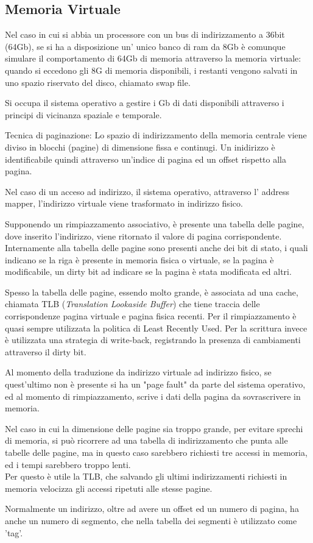 \documentclass[../template]{subfiles}
\begin{document}
\subsection{Memoria Virtuale}
Nel caso in cui si abbia un processore con un bus di indirizzamento a 36bit (64Gb), se si ha a disposizione un' unico banco di ram da 8Gb è comunque simulare il comportamento di 64Gb di memoria attraverso la memoria virtuale: quando si eccedono gli 8G di memoria disponibili, i restanti vengono salvati in uno spazio riservato del disco, chiamato swap file.

Si occupa il sistema operativo a gestire i Gb di dati disponibili attraverso i principi di vicinanza spaziale e temporale.

Tecnica di paginazione:
Lo spazio di indirizzamento della memoria centrale viene diviso in blocchi (pagine) di dimensione fissa e continugi. Un inidirizzo è identificabile quindi attraverso un'indice di pagina ed un offset rispetto alla pagina.

Nel caso di un acceso ad indirizzo, il sistema operativo, attraverso l' address mapper, l'indirizzo virtuale viene trasformato in indirizzo fisico.

Supponendo un rimpiazzamento associativo, è presente una tabella delle pagine, dove inserito l'indirizzo, viene ritornato il valore di pagina corrispondente. Internamente alla tabella delle pagine sono presenti anche dei bit di stato, i quali indicano se la riga è presente in memoria fisica o virtuale, se la pagina è modificabile, un dirty bit ad indicare se la pagina è stata modificata ed altri.

Spesso la tabella delle pagine, essendo molto grande, è associata ad una cache, chiamata TLB (\textit{Translation Lookaside Buffer}) che tiene traccia delle corrispondenze pagina virtuale e pagina fisica recenti.
Per il rimpiazzamento è quasi sempre utilizzata la politica di Least Recently Used. Per la scrittura invece è utilizzata una strategia di write-back, registrando la presenza di cambiamenti attraverso il dirty bit.

Al momento della traduzione da indirizzo virtuale ad indirizzo fisico, se quest'ultimo non è presente si ha un "page fault" da parte del sistema operativo, ed al momento di rimpiazzamento, scrive i dati della pagina da sovrascrivere in memoria.

Nel caso in cui la dimensione delle pagine sia troppo grande, per evitare sprechi di memoria, si può ricorrere ad una tabella di indirizzamento che punta alle tabelle delle pagine, ma in questo caso sarebbero richiesti tre accessi in memoria, ed i tempi sarebbero troppo lenti.
\\
Per questo è utile la TLB, che salvando gli ultimi indirizzamenti richiesti in memoria velocizza gli accessi ripetuti alle stesse pagine.

Normalmente un indirizzo, oltre ad avere un offset ed un numero di pagina, ha anche un numero di segmento, che nella tabella dei segmenti è utilizzato come 'tag'.
\end{document}
